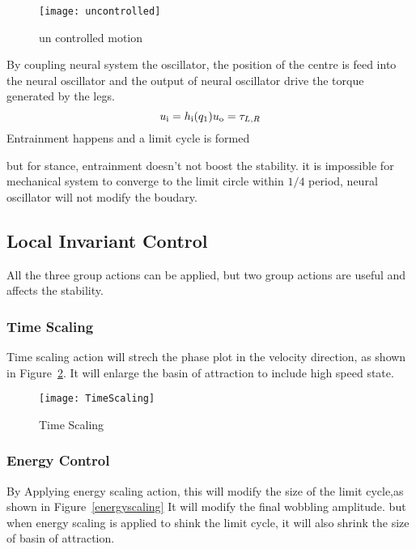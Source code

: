 \begin{figure}[!htbp]
  \begin{center}
     \texttt{[image: uncontrolled]}
    \caption{un controlled motion}
    \label{fig:stancepostures}
\end{center}
\end{figure}





By coupling neural system the oscillator, the position of the centre is feed into the neural oscillator and the output of neural oscillator drive the torque generated by the legs.
\[
u_{\mathrm{i}}=h_{\mathrm{i}}(q_1)\\
u_{\mathrm{o}}=\tau_{L,R}
\]
Entrainment happens and a limit cycle is formed

but for stance, entrainment doesn't not boost the stability.
it is impossible for mechanical system to converge to the limit circle within $1/4$ period, neural oscillator will not modify the boudary.


\subsection{Local Invariant Control}
All the three group actions can be applied, but two group actions are useful and affects the stability.
\subsubsection*{Time Scaling}
Time scaling action will strech the phase plot in the velocity direction, as shown in Figure~\ref{fig:stanceTimeScaling}.
It will enlarge the basin of attraction to include high speed state.
\begin{figure}[!htbp]
  \begin{center}
      \texttt{[image: TimeScaling]}
    \caption{Time Scaling}
    \label{fig:stanceTimeScaling}
\end{center}
\end{figure}



\subsubsection*{Energy Control}
By Applying energy scaling action, this will modify the size of the limit cycle,as shown in Figure~\ref{energyscaling}
It will modify the final wobbling amplitude.
but when energy scaling is applied to shink the limit cycle,
it will also shrink the size of basin of attraction.


